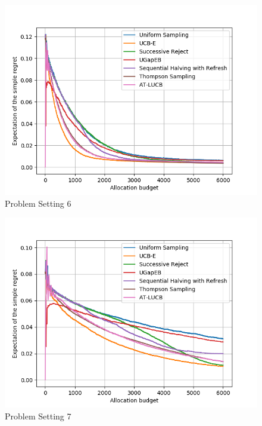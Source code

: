 \documentclass[runningheads,a4paper]{llncs}
\begin{document}
\begin{figure}[ht]
    	\centering\includegraphics[width=\textwidth]{../results/ts_mpa/setting6.png}
    	\caption{Problem Setting 6}
	\label{ts_mpa_6}
\end{figure}
\begin{figure}[ht]
   	\centering\includegraphics[width=\textwidth]{../results/ts_mpa/setting7.png}
   	 \caption{Problem Setting 7}
	\label{ts_mpa_7}
\end{figure}
\end{document}
